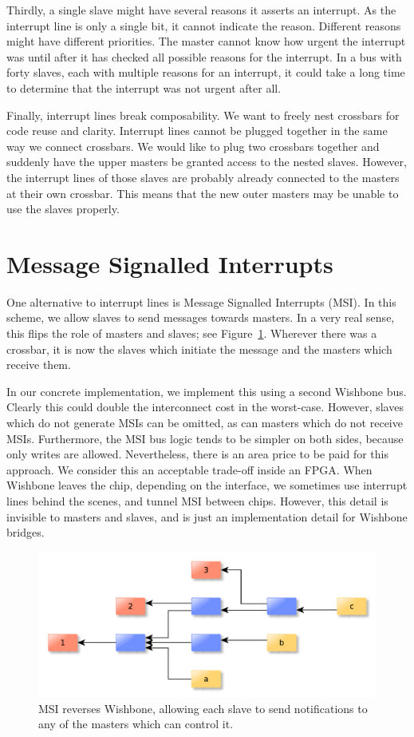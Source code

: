 \documentclass[a4paper]{jacow}
\begin{document}
Thirdly, a single slave might have several reasons it asserts an interrupt.  
As the interrupt line is only a single bit, it cannot indicate the reason.
Different reasons might have different priorities.
The master cannot know how urgent the interrupt was until after it has
checked all possible reasons for the interrupt.
In a bus with forty slaves, each with multiple reasons for an interrupt,
it could take a long time to determine that the interrupt was not urgent
after all.

Finally, interrupt lines break composability.
We want to freely nest crossbars for code reuse and clarity.
Interrupt lines cannot be plugged together in the same way we connect
crossbars.
We would like to plug two crossbars together and suddenly have the upper
masters be granted access to the nested slaves.
However, the interrupt lines of those slaves are probably already connected
to the masters at their own crossbar.
This means that the new outer masters may be unable to use the slaves
properly.

\section{Message Signalled Interrupts}

One alternative to interrupt lines is Message Signalled Interrupts (MSI).
In this scheme, we allow slaves to send messages towards masters.
In a very real sense, this flips the role of masters and slaves;
see Figure~\ref{fig:good-msi}.
Wherever there was a crossbar, it is now the slaves which initiate the
message and the masters which receive them.

In our concrete implementation, 
we implement this using a second Wishbone bus.
Clearly this could double the interconnect cost in the worst-case.
However, slaves which do not generate MSIs can be omitted,
as can masters which do not receive MSIs.
Furthermore, the MSI bus logic tends to be simpler on both sides,
because only writes are allowed.
Nevertheless, there is an area price to be paid for this approach.
We consider this an acceptable trade-off inside an FPGA.
When Wishbone leaves the chip, depending on the interface, we sometimes
use interrupt lines behind the scenes, and tunnel MSI between chips.
However, this detail is invisible to masters and slaves, and is just an
implementation detail for Wishbone bridges.

\begin{figure}[t]
  \centering
  \includegraphics*[width=\columnwidth]{good-msi}
  \caption{MSI reverses Wishbone, allowing each slave to send notifications to
  any of the masters which can control it.}
  \label{fig:good-msi}
\end{figure}
\end{document}
